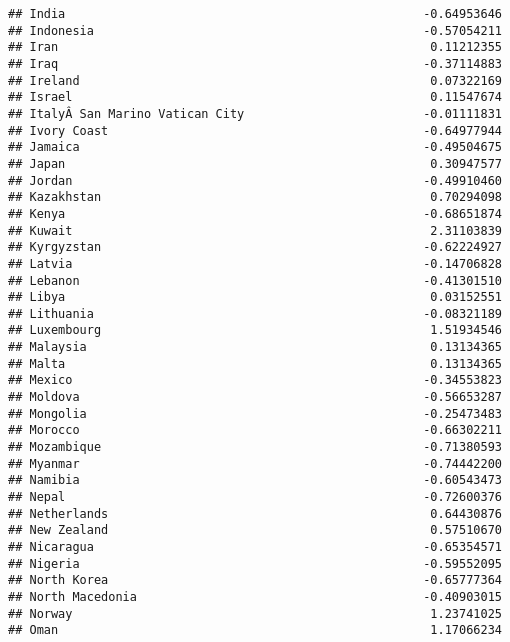 \documentclass[
]{article}
\begin{document}
\begin{verbatim}
## India                                                  -0.64953646
## Indonesia                                              -0.57054211
## Iran                                                    0.11212355
## Iraq                                                   -0.37114883
## Ireland                                                 0.07322169
## Israel                                                  0.11547674
## ItalyÂ San Marino Vatican City                         -0.01111831
## Ivory Coast                                            -0.64977944
## Jamaica                                                -0.49504675
## Japan                                                   0.30947577
## Jordan                                                 -0.49910460
## Kazakhstan                                              0.70294098
## Kenya                                                  -0.68651874
## Kuwait                                                  2.31103839
## Kyrgyzstan                                             -0.62224927
## Latvia                                                 -0.14706828
## Lebanon                                                -0.41301510
## Libya                                                   0.03152551
## Lithuania                                              -0.08321189
## Luxembourg                                              1.51934546
## Malaysia                                                0.13134365
## Malta                                                   0.13134365
## Mexico                                                 -0.34553823
## Moldova                                                -0.56653287
## Mongolia                                               -0.25473483
## Morocco                                                -0.66302211
## Mozambique                                             -0.71380593
## Myanmar                                                -0.74442200
## Namibia                                                -0.60543473
## Nepal                                                  -0.72600376
## Netherlands                                             0.64430876
## New Zealand                                             0.57510670
## Nicaragua                                              -0.65354571
## Nigeria                                                -0.59552095
## North Korea                                            -0.65777364
## North Macedonia                                        -0.40903015
## Norway                                                  1.23741025
## Oman                                                    1.17066234

\end{verbatim}
\end{document}

